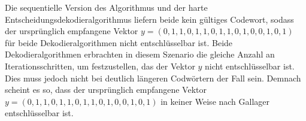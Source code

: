 \begin{Beispiel}
    
    Die sequentielle Version des Algorithmus und der harte Entscheidungsdekodieralgorithmus
    liefern beide kein gültiges Codewort, 
    sodass der ursprünglich empfangene Vektor $y = (0,1,1,0,1,1,0,1,1,0,1,0,0,1,0,1)$ für beide Dekodieralgorithmen 
    nicht entschlüsselbar ist. 
    Beide Dekodieralgorithmen erbrachten in diesem Szenario die gleiche Anzahl 
    an Iterationsschritten, um festzustellen, 
    das der Vektor $y$ nicht entschlüsselbar ist. 
    Dies muss jedoch nicht bei deutlich längeren Codwörtern 
    der Fall sein. Demnach scheint es so, dass der ursprünglich 
    empfangene Vektor $y = (0,1,1,0,1,1,0,1,1,0,1,0,0,1,0,1)$ in keiner Weise 
    nach Gallager entschlüsselbar ist.\\
    
\end{Beispiel}




